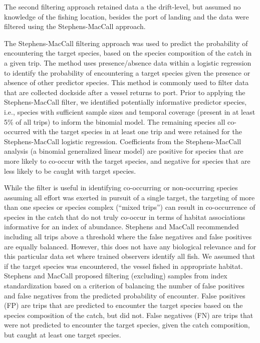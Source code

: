 \documentclass[
  authoryear,
  preprint,
  3p]{elsarticle}
\begin{document}
The second filtering approach retained data a the drift-level, but
assumed no knowledge of the fishing location, besides the port of
landing and the data were filtered using the Stephens-MacCall approach.

The Stephens-MacCall \citeyearpar{Stephens:2004:MAS} filtering approach
was used to predict the probability of encountering the target species,
based on the species composition of the catch in a given trip. The
method uses presence/absence data within a logistic regression to
identify the probability of encountering a target species given the
presence or absence of other predictor species. This method is commonly
used to filter data that are collected dockside after a vessel returns
to port. Prior to applying the Stephens-MacCall filter, we identified
potentially informative predictor species, i.e., species with sufficient
sample sizes and temporal coverage (present in at least 5\% of all
trips) to inform the binomial model. The remaining species all
co-occurred with the target species in at least one trip and were
retained for the Stephens-MacCall logistic regression. Coefficients from
the Stephens-MacCall analysis (a binomial generalized linear model) are
positive for species that are more likely to co-occur with the target
species, and negative for species that are less likely to be caught with
target species.

While the filter is useful in identifying co-occurring or non-occurring
species assuming all effort was exerted in pursuit of a single target,
the targeting of more than one species or species complex (``mixed
trips'') can result in co-occurrence of species in the catch that do not
truly co-occur in terms of habitat associations informative for an index
of abundance. Stephens and MacCall \citeyearpar{Stephens:2004:MAS}
recommended including all trips above a threshold where the false
negatives and false positives are equally balanced. However, this does
not have any biological relevance and for this particular data set where
trained observers identify all fish. We assumed that if the target
species was encountered, the vessel fished in appropriate habitat.
Stephens and MacCall \citeyearpar{Stephens:2004:MAS} proposed filtering
(excluding) samples from index standardization based on a criterion of
balancing the number of false positives and false negatives from the
predicted probability of encounter. False positives (FP) are trips that
are predicted to encounter the target species based on the species
composition of the catch, but did not. False negatives (FN) are trips
that were not predicted to encounter the target species, given the catch
composition, but caught at least one target species.
\end{document}
